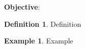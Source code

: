 \documentclass{report}
\theoremstyle{definition}
\newtheorem{example}{\bf Example}
\newtheorem{definition}{\bf Definition}[section]
\begin{document}
\vfill
 \noindent{}
 \newpage

 \section{   }
 \indent\hfill\small\noindent \textbf{Objective}: \normalsize\\
 \setcounter{example}{0}
 \setcounter{definition}{0}
 \begin{definition}
     Definition
 \end{definition}
 \begin{example}
     Example
 \end{example}

\vfill
 \noindent{}
 \newpage
\end{document}
